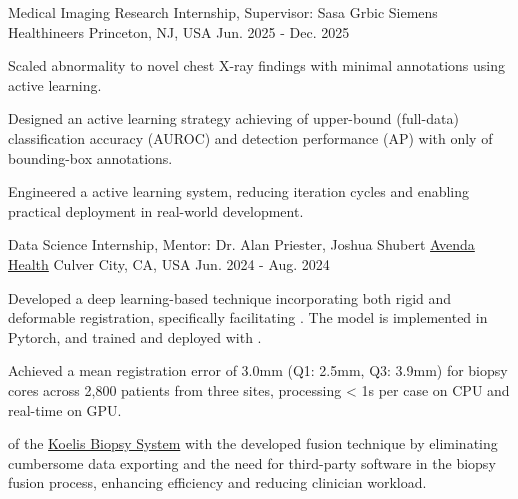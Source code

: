 
\begin{cventries}
\cventry
    {Medical Imaging Research Internship, Supervisor: Sasa Grbic}
    {{Siemens Healthineers}}
    {Princeton, NJ, USA}
    {Jun. 2025 - Dec. 2025}
    {
        \begin{cvitems}
            \item{Scaled abnormality  to novel chest X-ray findings with minimal annotations using active learning.}
\item{Designed an active learning strategy achieving  of upper-bound (full-data) classification accuracy (AUROC) and  detection performance (AP)  with only  of bounding-box annotations.}
\item{Engineered a  active learning system, reducing iteration cycles and enabling practical deployment in real-world development.}
        \end{cvitems}
    }
\end{cventries}

\begin{cventries}
\cventry
    {Data Science Internship, Mentor: Dr. Alan Priester, Joshua Shubert}
    { \href{https://avendahealth.com/}{Avenda Health}}
    {Culver City, CA, USA}
    {Jun. 2024 - Aug. 2024}
    {
        \begin{cvitems}
            \item{Developed a deep learning-based   technique incorporating both rigid and deformable registration, specifically facilitating . The model is implemented in Pytorch, and trained and deployed with .}
            \item{Achieved a mean registration error of 3.0mm (Q1: 2.5mm, Q3: 3.9mm) for biopsy cores across 2,800 patients from three sites, processing < 1s per case on CPU and real-time on GPU.}
            \item{
             of the \href{https://koelis.com/}{Koelis Biopsy System} with the developed fusion technique by eliminating cumbersome data exporting and the need for third-party software in the biopsy fusion process, enhancing efficiency and reducing clinician workload.
            }
        \end{cvitems}
    }
\end{cventries}


